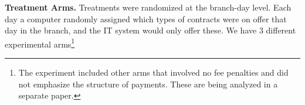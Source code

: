 \documentclass[oneside,11pt]{article}
\begin{document}

\vspace{.2in}
\noindent \textbf{Treatment Arms.} Treatments were randomized at the branch-day level. Each day a computer randomly assigned which types of contracts were on offer that day in the branch, and the IT system would only offer these.  We have 3 different experimental arms\footnote{The experiment included other arms that involved no fee penalties and did not emphasize the structure of payments. These are being analyzed in a separate paper.} 
\end{document}
